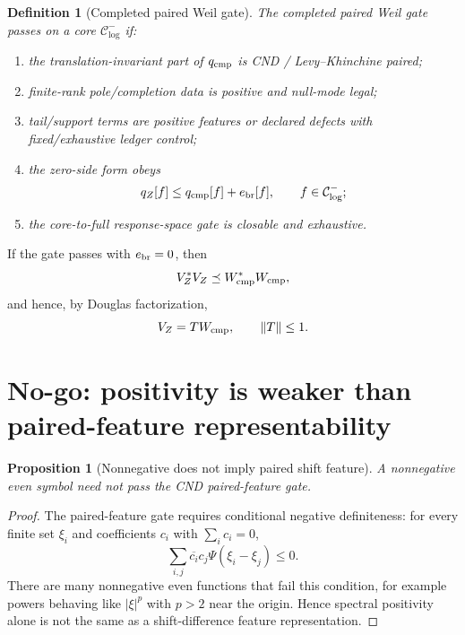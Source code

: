 \documentclass[11pt]{article}
\newtheorem{proposition}{Proposition}
\newtheorem{definition}{Definition}
\begin{document}
\begin{definition}[Completed paired Weil gate]
The completed paired Weil gate passes on a core \(\mathcal C^-_{\log}\) if:
\begin{enumerate}
\item the translation-invariant part of \(q_{\rm cmp}\) is CND / Levy--Khinchine paired;
\item finite-rank pole/completion data is positive and null-mode legal;
\item tail/support terms are positive features or declared defects with fixed/exhaustive ledger control;
\item the zero-side form obeys
\[
  q_Z[f]\le q_{\rm cmp}[f]+e_{\rm br}[f],\qquad f\in\mathcal C^-_{\log};
\]
\item the core-to-full response-space gate is closable and exhaustive.
\end{enumerate}
\end{definition}

If the gate passes with \(e_{\rm br}=0\), then
\[
  V_Z^*V_Z\preceq W_{\rm cmp}^*W_{\rm cmp},
\]
and hence, by Douglas factorization,
\[
  V_Z=T W_{\rm cmp},\qquad \|T\|\le1.
\]

\section{No-go: positivity is weaker than paired-feature representability}
\begin{proposition}[Nonnegative does not imply paired shift feature]
A nonnegative even symbol need not pass the CND paired-feature gate.
\end{proposition}
\begin{proof}
The paired-feature gate requires conditional negative definiteness: for every finite set \(\xi_i\) and coefficients \(c_i\) with \(\sum_i c_i=0\),
\[
  \sum_{i,j}\overline{c_i}c_j\Psi(\xi_i-\xi_j)\le0.
\]
There are many nonnegative even functions that fail this condition, for example powers behaving like \(|\xi|^p\) with \(p>2\) near the origin.  Hence spectral positivity alone is not the same as a shift-difference feature representation.
\end{proof}
\end{document}
